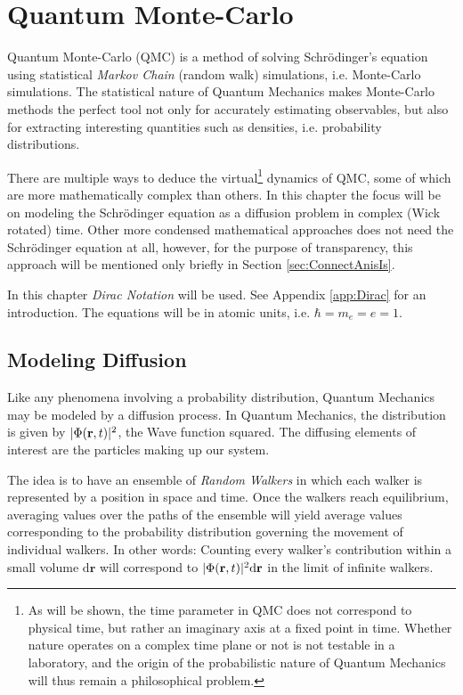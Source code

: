 \chapter{Quantum Monte-Carlo}
\label{ch:QMC}

Quantum Monte-Carlo (QMC) is a method of solving Schrödinger's equation using statistical \textit{Markov Chain} (random walk) simulations, i.e. Monte-Carlo simulations. The statistical nature of Quantum Mechanics makes Monte-Carlo methods the perfect tool not only for accurately estimating observables, but also for extracting interesting quantities such as densities, i.e. probability distributions. 

There are multiple ways to deduce the virtual\footnote{As will be shown, the time parameter in QMC does not correspond to physical time, but rather an imaginary axis at a fixed point in time. Whether nature operates on a complex time plane or not is not testable in a laboratory, and the origin of the probabilistic nature of Quantum Mechanics will thus remain a philosophical problem.} dynamics of QMC, some of which are more mathematically complex than others. In this chapter the focus will be on modeling the Schrödinger equation as a diffusion problem in complex (Wick rotated) time. Other more condensed mathematical approaches does not need the Schrödinger equation at all, however, for the purpose of transparency, this approach will be mentioned only briefly in Section \ref{sec:ConnectAnisIs}.

In this chapter \textit{Dirac Notation} will be used. See Appendix \ref{app:Dirac} for an introduction. The equations will be in atomic units, i.e. $\hbar = m_e = e = 1$.

\section{Modeling Diffusion}

Like any phenomena involving a probability distribution, Quantum Mechanics may be modeled by a diffusion process. In Quantum Mechanics, the distribution is given by $|\Phi(\mathbf{r}, t)|^2$, the Wave function squared. The diffusing elements of interest are the particles making up our system. 

The idea is to have an ensemble of \textit{Random Walkers} in which each walker is represented by a position in space and time. Once the walkers reach equilibrium, averaging values over the paths of the ensemble will yield average values corresponding to the probability distribution governing the movement of individual walkers. In other words: Counting every walker's contribution within a small volume $\mathrm{d}\mathbf{r}$ will correspond to $|\Phi(\mathbf{r}, t)|^2\mathrm{d}\mathbf{r}$ in the limit of infinite walkers.


